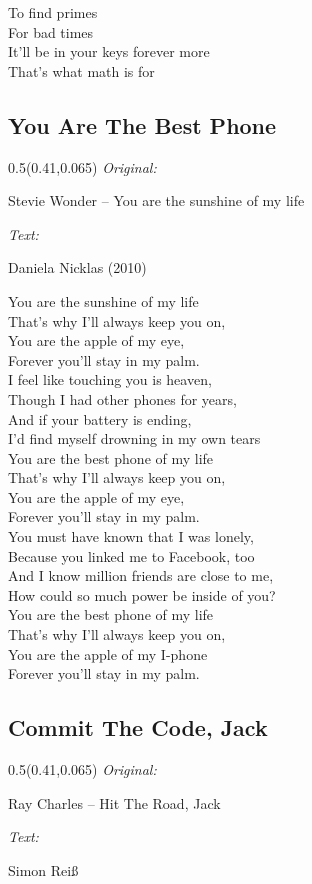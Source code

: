 \documentclass[11pt,a5paper]{article}
\newcommand\songinfo[2]{\begin{textblock}{0.5}(0.41,0.065)
		\footnotesize
		\hfill \textit{Original:} \ \ \ \ \ \ \ \ \ \ \ \ \ \ \ \ \ \ \ \ 
		
		\hfill #1
		
		\hfill  \textit{Text:} \ \ \ \ \ \ \ \ \ \ \ \ \ \ \ \ \ \ \ \ 
		
		\hfill #2
	\end{textblock}}
\begin{document}
			To find primes \\
			For bad times \\
			It’ll be in your keys forever more \\
			That's what math is for \\
			\pagebreak
			\subsection{You Are The Best Phone}
			\songinfo{Stevie Wonder – You are the sunshine of my life}{Daniela Nicklas (2010)}
			You are the sunshine of my life \\
			That's why I'll always keep you on, \\
			You are the apple of my eye, \\
			Forever you'll stay in my palm. \\
			
			I feel like touching you is heaven, \\
			Though I had other phones for years, \\
			And if your battery is ending, \\
			I'd find myself drowning in my own tears \\
			
			You are the best phone of my life \\
			That's why I'll always keep you on, \\
			You are the apple of my eye, \\
			Forever you'll stay in my palm. \\
			
			You must have known that I was lonely, \\
			Because you linked me to Facebook, too \\
			And I know million friends are close to me, \\
			How could so much power be inside of you? \\
			
			You are the best phone of my life \\
			That's why I'll always keep you on, \\
			You are the apple of my I-phone \\
			Forever you'll stay in my palm. \\
			\pagebreak
			\subsection{Commit The Code, Jack}
			\songinfo{Ray Charles -- Hit The Road, Jack}{Simon Reiß}
			
\end{document}
